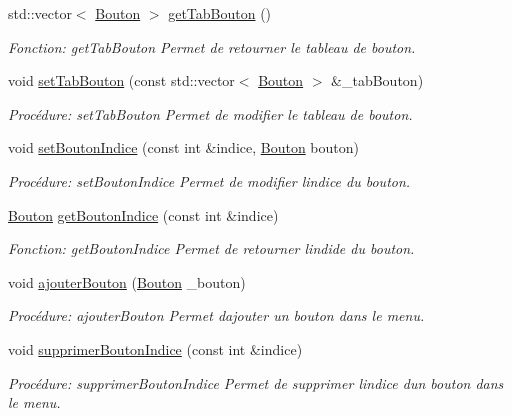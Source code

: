 \begin{DoxyCompactItemize}
std\+::vector$<$ \hyperlink{classBouton}{Bouton} $>$ \hyperlink{classMenu_a6d80af8bd800d44072ddb63a80b911cd}{get\+Tab\+Bouton} ()
\begin{DoxyCompactList}\small\item\em Fonction\+: get\+Tab\+Bouton Permet de retourner le tableau de bouton. \end{DoxyCompactList}\item 
void \hyperlink{classMenu_a45b3fe1a4d7cca82acabd3102d8bfd7c}{set\+Tab\+Bouton} (const std\+::vector$<$ \hyperlink{classBouton}{Bouton} $>$ \&\+\_\+tab\+Bouton)
\begin{DoxyCompactList}\small\item\em Procédure\+: set\+Tab\+Bouton Permet de modifier le tableau de bouton. \end{DoxyCompactList}\item 
void \hyperlink{classMenu_acedbb44af6fcc981aef033a585df2169}{set\+Bouton\+Indice} (const int \&indice, \hyperlink{classBouton}{Bouton} bouton)
\begin{DoxyCompactList}\small\item\em Procédure\+: set\+Bouton\+Indice Permet de modifier l\textquotesingle{}indice du bouton\textquotesingle{}. \end{DoxyCompactList}\item 
\hyperlink{classBouton}{Bouton} \hyperlink{classMenu_a16bc4dffec20a0ce177f189f9c711e09}{get\+Bouton\+Indice} (const int \&indice)
\begin{DoxyCompactList}\small\item\em Fonction\+: get\+Bouton\+Indice Permet de retourner l\textquotesingle{}indide du bouton. \end{DoxyCompactList}\item 
void \hyperlink{classMenu_a429b2c8fcaed081553ce284ffa0637ab}{ajouter\+Bouton} (\hyperlink{classBouton}{Bouton} \+\_\+bouton)
\begin{DoxyCompactList}\small\item\em Procédure\+: ajouter\+Bouton Permet d\textquotesingle{}ajouter un bouton dans le menu. \end{DoxyCompactList}\item 
void \hyperlink{classMenu_a1ed5172963be698f6fbabcf5a87ff664}{supprimer\+Bouton\+Indice} (const int \&indice)
\begin{DoxyCompactList}\small\item\em Procédure\+: supprimer\+Bouton\+Indice Permet de supprimer l\textquotesingle{}indice d\textquotesingle{}un bouton dans le menu. \end{DoxyCompactList}\item 

\end{DoxyCompactItemize}

